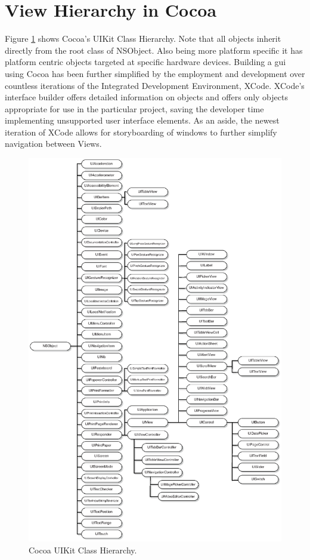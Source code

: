 \documentclass[a4paper,14pt]{article}
\begin{document}
\section{View Hierarchy in Cocoa} %
\label{sec:view_hierarchy_in_cocoa}
Figure \ref{fig:cocoaHierarchy} shows Cocoa's UIKit Class Hierarchy. Note that all objects inherit directly from the root class of NSObject. Also being more platform specific it has platform centric objects targeted at specific hardware devices. Building a \gls{gui} using Cocoa has been further simplified by the employment and development over countless iterations of the Integrated Development Environment, XCode. XCode's interface builder offers detailed information on objects and offers only objects appropriate for use in the particular project, saving the developer time implementing unsupported user interface elements. As an aside, the newest iteration of XCode allows for storyboarding of windows to further simplify navigation between Views.


\begin{figure}[H]
\centering
\includegraphics[scale=0.80]{UIKitClassHierarchy.eps}
\caption{Cocoa UIKit Class Hierarchy. \protect{} }
\label{fig:cocoaHierarchy}
\end{figure}
\end{document}
